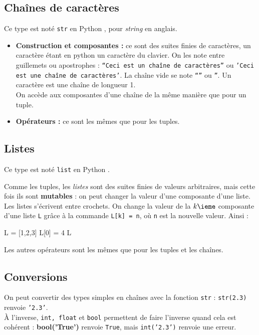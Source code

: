 \subsection{Chaînes de caractères}
\begin{defi}
Ce type est noté \texttt{str} en Python , pour \emph{string} en anglais.
\begin{itemize}
\item \textbf{Construction et composantes :} ce sont des suites finies de caractères, un caractère étant en python un caractère du clavier. On 
les note entre guillemets ou apostrophes : \texttt{``Ceci est un chaîne de caractères''} ou  
\texttt{'Ceci est une chaîne de caractères'}. La chaîne vide se note \texttt{``}\texttt{''} ou 
\texttt{''}. Un caractère est une chaîne de longueur 1.\\
On accède aux composantes d'une chaîne de la même manière que pour un tuple.
\item \textbf{Opérateurs :} ce sont les mêmes que pour les tuples.
\end{itemize}
\end{defi}
\subsection{Listes}
\begin{defi}[Listes]
Ce type est noté \texttt{list} en Python .

Comme les tuples, les \emph{listes} sont des suites finies de valeurs arbitraires, mais cette fois 
ils sont \textbf{mutables} : on peut changer la valeur d'une composante d'une liste.\\
Les listes s'écrivent entre crochets. On change la valeur de la $k\ieme$ composante d'une liste 
\texttt{L} grâce à la commande \texttt{L[k] = n}, où \texttt{n} est la nouvelle valeur. Ainsi :
\begin{pyconsole}
L = [1,2,3] 
L[0] = 4  
L 
\end{pyconsole}

Les autres opérateurs sont les mêmes que pour les tuples et les chaînes.
\end{defi}

\subsection{Conversions}

On peut convertir des types simples en chaînes avec la fonction \texttt{str} : \texttt{str(2.3)} 
renvoie \texttt{'2.3'}.\\
À l'inverse, \texttt{int, float} et \texttt{bool} permettent de faire l'inverse quand cela est 
cohérent : \textbf{bool('True')} renvoie \texttt{True}, mais \texttt{int('2.3')} renvoie une 
erreur.\\

